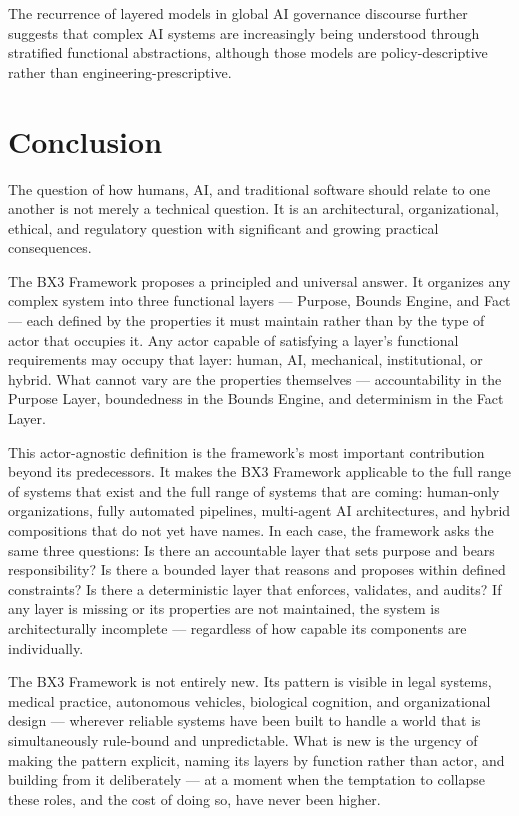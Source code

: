\documentclass[12pt]{article}
\begin{document}
The recurrence of layered models in global AI governance discourse \cite{sabah2026} further suggests that complex AI systems are increasingly being understood through stratified functional abstractions, although those models are policy-descriptive rather than engineering-prescriptive.

\section{Conclusion}
\label{sec:conclusion}

The question of how humans, AI, and traditional software should relate to one another is not merely a technical question. It is an architectural, organizational, ethical, and regulatory question with significant and growing practical consequences.

The BX3 Framework proposes a principled and universal answer. It organizes any complex system into three functional layers --- Purpose, Bounds Engine, and Fact --- each defined by the properties it must maintain rather than by the type of actor that occupies it. Any actor capable of satisfying a layer's functional requirements may occupy that layer: human, AI, mechanical, institutional, or hybrid. What cannot vary are the properties themselves --- accountability in the Purpose Layer, boundedness in the Bounds Engine, and determinism in the Fact Layer.

This actor-agnostic definition is the framework's most important contribution beyond its predecessors. It makes the BX3 Framework applicable to the full range of systems that exist and the full range of systems that are coming: human-only organizations, fully automated pipelines, multi-agent AI architectures, and hybrid compositions that do not yet have names. In each case, the framework asks the same three questions: Is there an accountable layer that sets purpose and bears responsibility? Is there a bounded layer that reasons and proposes within defined constraints? Is there a deterministic layer that enforces, validates, and audits? If any layer is missing or its properties are not maintained, the system is architecturally incomplete --- regardless of how capable its components are individually.

The BX3 Framework is not entirely new. Its pattern is visible in legal systems, medical practice, autonomous vehicles, biological cognition, and organizational design --- wherever reliable systems have been built to handle a world that is simultaneously rule-bound and unpredictable. What is new is the urgency of making the pattern explicit, naming its layers by function rather than actor, and building from it deliberately --- at a moment when the temptation to collapse these roles, and the cost of doing so, have never been higher.
\end{document}
